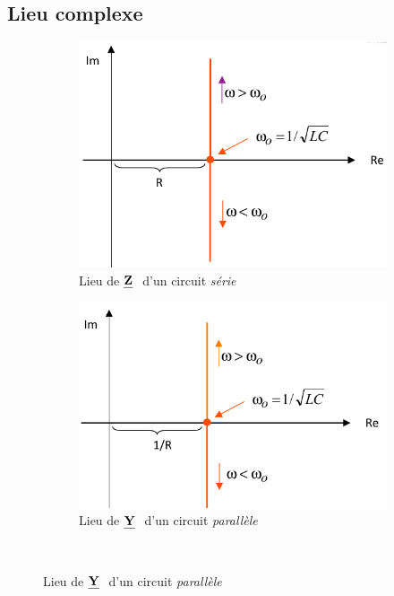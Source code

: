 \documentclass[12pt,a4paper]{article}
\newcommand{\uz}{\uline{Z} }
\newcommand{\uy}{\uline{Y} }
\begin{document}
\subsection{Lieu complexe}
\begin{figure}
	\centering
	\begin{subfigure}[b]{0.45\textwidth}
		\centering
		\includegraphics[scale=0.5]{images/lieu_de_z}
		\caption{Lieu de $\textbf{\uz}$ d'un circuit \textit{série}}
		\label{subfig: lieu complexe de z}
	\end{subfigure}
	\begin{subfigure}[b]{0.45\textwidth}
		\centering
		\includegraphics[scale=0.55]{images/lieu_de_y}
		\caption{Lieu de $\textbf{\uy}$ d'un circuit \textit{parallèle}}
		\label{subfig: lieu complexe de y}
	\end{subfigure}\\

\end{figure}
\end{document}
